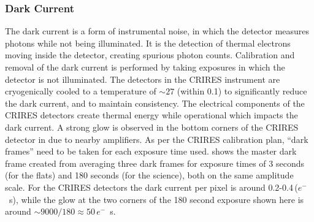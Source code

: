 \subsubsection{Dark Current}
\label{subsubsec:darkcurrent}
The dark current is a form of instrumental noise, in which the detector measures photons while not being illuminated.
It is the detection of thermal electrons moving inside the detector, creating spurious photon counts.
Calibration and removal of the dark current is performed by taking exposures in which the detector is not illuminated.
The detectors in the {CRIRES} instrument are cryogenically cooled to a temperature of \(\sim 27\)\K{} (within 0.1\K{}) to significantly reduce the dark current, and to maintain consistency.
The electrical components of the {CRIRES} detectors create thermal energy while operational which impacts the dark current.
A strong glow is observed in the bottom corners of the {CRIRES} detector in  due to nearby amplifiers.
As per the {CRIRES} calibration plan, ``dark frames'' need to be taken for each exposure time used.  shows the master dark frame created from averaging three dark frames for exposure times of 3 seconds (for the flats) and 180 seconds (for the science), both on the same amplitude scale.
For the {CRIRES} detectors the dark current per pixel is around 0.2-0.4\,(\(e^{-}\)\si{\per\second}), while the glow at the two corners of the 180 second exposure shown here is around \(\sim9000 / 180\approx50\)\,\(e^{-}\)\si{\per\second}.

%


